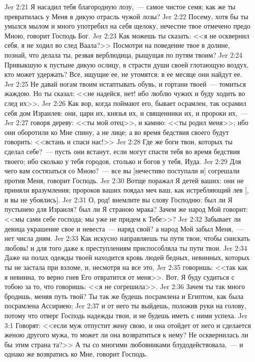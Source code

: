 \vs Jer 2:21 Я насадил тебя  благородную лозу,~--- самое чистое семя; как же ты превратилась у Меня в дикую отрасль чужой лозы?
\vs Jer 2:22 Посему, хотя бы ты умылся мылом и много употребил на себя щелоку, нечестие твое отмечено предо Мною, говорит Господь Бог.
\vs Jer 2:23 Как можешь ты сказать: <<я не осквернил себя, я не ходил во след Ваала?>> Посмотри на поведение твое в долине, познай, что делала ты, резвая верблюдица, рыщущая по путям твоим?
\vs Jer 2:24 Привыкшую к пустыне дикую ослицу, в страсти души своей глотающую воздух, кто может удержать? Все, ищущие ее, не утомятся: в ее месяце они найдут ее.
\vs Jer 2:25 Не давай ногам твоим истаптывать обувь, и гортани твоей~--- томиться жаждою. Но ты сказал: <<не надейся, нет! ибо люблю чужих и буду ходить во след их>>.
\vs Jer 2:26 Как вор, когда поймают его, бывает осрамлен, так осрамил себя дом Израилев: они, цари их, князья их, и священники их, и пророки их,~---
\vs Jer 2:27 говоря дереву: <<ты мой отец>>, и камню: <<ты родил меня>>; ибо они оборотили ко Мне спину, а не лице; а во время бедствия своего будут говорить: <<встань и спаси нас!>>
\vs Jer 2:28 Где же боги твои, которых ты сделал себе?~--- пусть они встанут, если могут спасти тебя во время бедствия твоего; ибо сколько у тебя городов, столько и богов у тебя, Иуда.
\vs Jer 2:29 Для чего вам состязаться со Мною?~--- все вы [нечестиво поступали и] согрешали против Меня, говорит Господь.
\vs Jer 2:30 Вотще поражал Я детей ваших: они не приняли вразумления; пророков ваших поядал меч ваш, как истребляющий лев [, и вы не убоялись].
\vs Jer 2:31 О, род! внемлите вы слову Господню: был ли Я пустынею для Израиля? был ли Я страною мрака? Зачем же народ Мой говорит: <<мы сами себе господа; мы уже не придем к Тебе>>?
\vs Jer 2:32 Забывает ли девица украшение свое и невеста~--- наряд свой? а народ Мой забыл Меня,~--- нет числа дням.
\vs Jer 2:33 Как искусно направляешь ты пути твои, чтобы снискать любовь! и для того даже к преступлениям приспособляла ты пути твои.
\vs Jer 2:34 Даже на полах одежды твоей находится кровь людей бедных, невинных, которых ты не застала при взломе, и, несмотря на все это,
\vs Jer 2:35 говоришь: <<так как я невинна, то верно гнев Его отвратится от меня>>. Вот, Я буду судиться с тобою за то, что говоришь: <<я не согрешила>>.
\vs Jer 2:36 Зачем ты так много бродишь, меняя путь твой? Ты так же будешь посрамлена и Египтом, как была посрамлена Ассириею;
\vs Jer 2:37 и от него ты выйдешь, положив руки на голову, потому что отверг Господь надежды твои, и не будешь иметь с ними успеха.
\vs Jer 3:1 Говорят: <<если муж отпустит жену свою, и она отойдет от него и сделается женою другого мужа, то может ли она возвратиться к нему? Не осквернилась ли бы этим страна та?>> А ты со многими любовниками блудодействовала,~--- и однако же возвратись ко Мне, говорит Господь.
